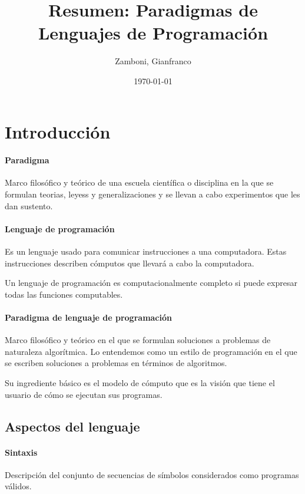 \documentclass[10pt,a4paper]{article}
\begin{document}
\title{Resumen: Paradigmas de Lenguajes de Programación}

\date{\today}

\author{Zamboni, Gianfranco}

\maketitle
\tableofcontents

\newpage
\setcounter{page}{1}

\section{Introducción}
\paragraph{Paradigma} Marco filosófico y teórico de una escuela científica o disciplina en la que se formulan teorias, leyess y generalizaciones y se llevan a cabo experimentos que les dan sustento.

\paragraph{Lenguaje de programación} Es un lenguaje usado para comunicar instrucciones a una computadora. Estas instrucciones describen cómputos que llevará a cabo la computadora.

Un lenguaje de programación es computacionalmente completo si puede expresar todas las funciones computables.

\paragraph{Paradigma de lenguaje de programación} Marco filosófico y teórico en el que se formulan soluciones a problemas de naturaleza algorítmica. Lo entendemos como un estilo de programación en el que se escriben soluciones a problemas en términos de algoritmos.

Su ingrediente básico es el modelo de cómputo que es la visión que tiene el usuario de cómo se ejecutan sus programas.

\subsection{Aspectos del lenguaje}

\paragraph{Sintaxis} Descripción del conjunto de secuencias de símbolos considerados como programas válidos.
\end{document}
